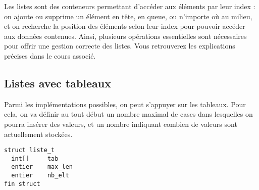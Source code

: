 \documentclass[11pt,a4paper]{article}
\begin{document}
\bigskip

Les listes sont des conteneurs permettant d'accéder aux éléments par leur index : on ajoute ou supprime un élément en tête, en queue, ou n'importe où au milieu, et on recherche la position des éléments selon leur index pour pouvoir accéder aux données contenues.
Ainsi, plusieurs opérations essentielles sont nécessaires pour offrir une gestion correcte des listes.
Vous retrouverez les explications précises dans le cours associé.

\bigskip


\subsection{Listes avec tableaux}

\bigskip

Parmi les implémentations possibles, on peut s'appuyer sur les tableaux.
Pour cela, on va définir au tout début un nombre maximal de cases dans lesquelles on pourra insérer des valeurs, et un nombre indiquant combien de valeurs sont actuellement stockées.

\begin{center}
\begin{lstlisting}[style=algorithmique]
struct liste_t
  int[]     tab
  entier    max_len
  entier    nb_elt
fin struct \end{lstlisting}
\end{center}


\end{document}
